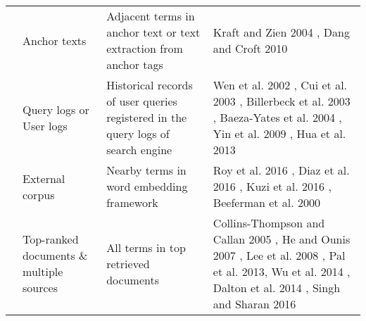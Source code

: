 \begin{table}[!h]
{\begin{tabular}{ | M{2.2cm} | M{2.2cm} | M{3.3cm} | M{4.5cm} | }
			\\ \hline
			 & Anchor texts & Adjacent terms in anchor text or text extraction from anchor tags & Kraft and Zien 2004 \cite{kraft2004mining}, Dang and Croft 2010 \cite{dang2010query}   \\  & Query logs or User logs & Historical records of user queries registered in the query logs
			of search engine & Wen et al. 2002 \cite{wen2002query}, Cui et al. 2003 \cite{cui2003query}, Billerbeck et al. 2003 \cite{billerbeck2003query}, Baeza-Yates et al. 2004 \cite{baeza2004query}, Yin et al. 2009 \cite{yin2009query}, Hua et al. 2013 \cite{hua2013clickage} \\  & External corpus & Nearby terms in word embedding framework & Roy et al. 2016 \cite{roy2016using}, Diaz et al. 2016 \cite{diaz2016query}, Kuzi et al. 2016 \cite{kuzi2016query}, Beeferman et al. 2000 \cite{beeferman2000agglomerative} 
			\\ \hline
			  & Top-ranked documents \& multiple sources & All terms in top retrieved documents  & Collins-Thompson and Callan 2005 \cite{collins2005query}, He and Ounis 2007 \cite{he2007combining}, Lee et al. 2008 \cite{lee2008cluster}, Pal et al. 2013\cite{pal2013query}, Wu et al. 2014 \cite{Wu:2014:ISR:2556195.2556239}, Dalton et al. 2014 \cite{dalton2014entity}, Singh and Sharan 2016 \cite{singh2016new} \\ \hline
			
	\end{tabular}}
\end{table}

